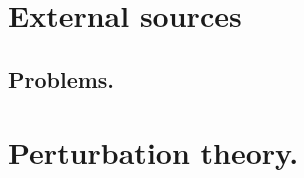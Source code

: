    \chapter{External sources}
      
      
      
      
      \section{Problems.}
         
         
   \chapter{Perturbation theory.}
      
      
      
      
